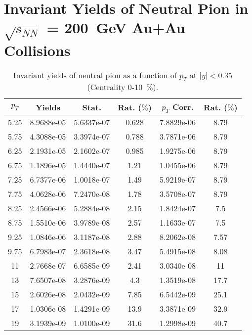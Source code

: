 \chapter{Invariant Yields of Neutral Pion in $\sqrt{s_{NN}}$ = 200~GeV Au+Au Collisions}
\begin{table}[!htb]
\centering
\begin{tabular}{|c|c|c|c|c|c|}
\hline
$p_{T}$ & Yields & Stat. & Rat. ($\%$) & $p_{T}$ Corr. & Rat. ($\%$) \\
\hline
5.25 & 8.9688e-05 & 5.6337e-07 & 0.628 & 7.8829e-06 & 8.79 \\ 
5.75 & 4.3088e-05 & 3.3974e-07 & 0.788 & 3.7871e-06 & 8.79 \\ 
6.25 & 2.1931e-05 & 2.1602e-07 & 0.985 & 1.9275e-06 & 8.79 \\ 
6.75 & 1.1896e-05 & 1.4440e-07 & 1.21 & 1.0455e-06 & 8.79 \\ 
7.25 & 6.7377e-06 & 1.0018e-07 & 1.49 & 5.9219e-07 & 8.79 \\ 
7.75 & 4.0628e-06 & 7.2470e-08 & 1.78 & 3.5708e-07 & 8.79 \\ 
8.25 & 2.4566e-06 & 5.2884e-08 & 2.15 & 1.8424e-07 & 7.5 \\ 
8.75 & 1.5510e-06 & 3.9789e-08 & 2.57 & 1.1633e-07 & 7.5 \\ 
9.25 & 1.0846e-06 & 3.1187e-08 & 2.88 & 8.2062e-08 & 7.57 \\ 
9.75 & 6.7983e-07 & 2.3618e-08 & 3.47 & 5.4915e-08 & 8.08 \\ 
11 & 2.7668e-07 & 6.6585e-09 & 2.41 & 3.0340e-08 & 11 \\ 
13 & 7.6507e-08 & 3.2876e-09 & 4.3 & 1.3519e-08 & 17.7 \\ 
15 & 2.6026e-08 & 2.0432e-09 & 7.85 & 6.5442e-09 & 25.1 \\ 
17 & 1.0306e-08 & 1.4291e-09 & 13.9 & 3.3871e-09 & 32.9 \\ 
19 & 3.1939e-09 & 1.0100e-09 & 31.6 & 1.2998e-09 & 40.7 \\ 
\hline
\end{tabular}
\caption{Invariant yields of neutral pion as a function of $p_{T}$ at $|y|<0.35$ (Centrality 0-10~$\%$).}
\end{table}
            
